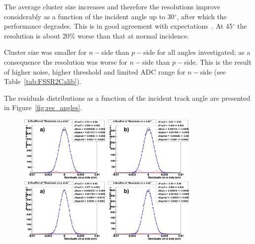 The average cluster size increases and therefore the resolutions improve considerably as a function 
of the incident angle up to 30$^{\circ}$, after which the performance degrades. This is 
in good agreement with expectations~\cite{TURCHETTA}. At 45$^{\circ}$ the resolution is 
about 20\% worse than that at normal incidence. 

Cluster size was smaller for $n-$side than $p-$side for all angles investigated; as a consequence 
the resolution was worse for $n-$side than $p-$side. This is the result of higher noise, higher 
threshold and limited ADC range for $n-$side (see Table~\ref{tab:FSSR2Calib}).

The residuals distributions as a function of the incident track angle are presented in 
Figure~\ref{fig:res_angles}.

\begin{figure}[!htpb]
\centering
\includegraphics[width=0.39\textwidth]{res_pside_5deg.pdf}
\includegraphics[width=0.39\textwidth]{res_nside_5deg.pdf}
\includegraphics[width=0.39\textwidth]{res_pside_10deg.pdf}
\includegraphics[width=0.39\textwidth]{res_nside_10deg.pdf}

\end{figure}
